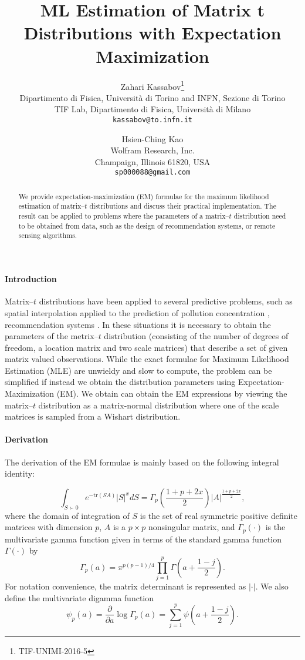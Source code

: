 \documentclass[english,listof=totoc]{scrartcl}
\title{ML Estimation of Matrix t Distributions with Expectation Maximization}
\author{Zahari Kassabov\thanks{TIF-UNIMI-2016-5}\\
        Dipartimento di Fisica, Universit\`a di Torino and INFN, Sezione di Torino\\
		TIF Lab, Dipartimento di Fisica, Universit\`a di Milano\\
        \texttt{kassabov@to.infn.it}\\
        \and
        Hsien-Ching Kao\\
        Wolfram Research, Inc.\\
		Champaign, Illinois 61820, USA\\
		\texttt{sp000088@gmail.com}
		}
\begin{document}
\maketitle

\begin{abstract}
We provide expectation-maximization (EM) formulae for the maximum
likelihood estimation of matrix--$t$ distributions and discuss their
practical implementation.  The result can be applied to problems where
the parameters of a matrix--$t$ distribution need to be obtained from
data, such as the design of recommendation systems, or remote sensing
algorithms.
\end{abstract}

\paragraph{Introduction}
Matrix--$t$ distributions have been applied to several predictive
problems, such as spatial interpolation applied to the prediction of
pollution concentration \citep{KIBRIA2006785}, recommendation systems
\citep{NIPS2007_3203}. In these situations it is necessary to obtain
the parameters of the metrix--$t$ distribution (consisting of the
number of degrees of freedom, a location matrix and two scale
matrices) that describe a set of given matrix valued observations.
While the exact formulae for Maximum Likelihood Estimation (MLE) are
unwieldy and slow to compute, the problem can be simplified if instead
we obtain the distribution parameters using Expectation-Maximization
(EM). We obtain can obtain the EM expressions by viewing the
matrix--$t$  distribution as a matrix-normal distribution where one of
the scale matrices is sampled from a Wishart distribution.

\paragraph{Derivation}

The derivation of the EM formulae is mainly based on the following integral identity:

\begin{equation}
\int_{S\succ 0}e^{-\textrm{tr}(SA)}|S|^{x}dS=\Gamma_{p}\left(\frac{1+p+2x}{2}\right)|A|^{\frac{1+p+2x}{2}},\label{eq:intmultgammadef}
\end{equation}
where the domain of integration of $S$ is the set of real symmetric positive definite
matrices with dimension $p$, $A$ is a $p\times p$ nonsingular matrix, and $\Gamma_{p}(\cdot)$ is the multivariate gamma function given in terms of the standard gamma function $\Gamma(\cdot)$ by
\begin{equation}
\Gamma_{p}(a)=\pi^{p(p-1)/4}\prod_{j=1}^{p}\Gamma\left(a+\frac{1-j}{2}\right).\label{eq:multgammadef}
\end{equation}
For notation convenience, the matrix determinant is represented as $|\cdot|$. We also define the multivariate digamma function
\begin{equation}
\psi_{p}(a)=\frac{\partial}{\partial a}\log\Gamma_{p}(a)=\sum_{j=1}^{p}\psi\left(a+\frac{1-j}{2}\right).
\end{equation}
\end{document}
